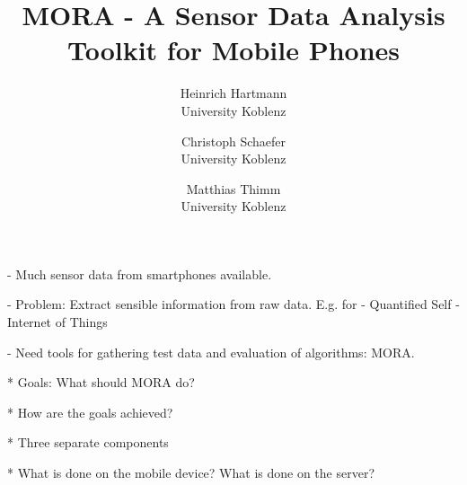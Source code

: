 \documentclass[times, 10pt,twocolumn]{article}
\begin{document}
\title{MORA - A Sensor Data Analysis Toolkit for Mobile Phones}

\author{Heinrich Hartmann\\
University Koblenz\\ %
\and
Christoph Schaefer \\
University Koblenz \\
\and
Matthias Thimm \\
University Koblenz \\
}

\maketitle
\thispagestyle{empty}

\begin{abstract}
\end{abstract}

- Much sensor data from smartphones available.

- Problem: Extract sensible information from raw data. E.g. for
  - Quantified Self
  - Internet of Things

- Need tools for gathering test data and evaluation of algorithms: MORA.


* Goals: What should MORA do?


* How are the goals achieved?

* Three separate components

* What is done on the mobile device? What is done on the server?
\end{document}
